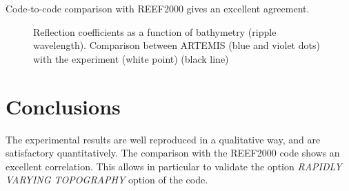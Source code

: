 Code-to-code comparison with REEF2000 gives an excellent agreement.

\begin{figure}[h]
\begin{center}
\end{center}
\caption{Reflection coefficients as a function of bathymetry (ripple wavelength).
Comparison between ARTEMIS (blue and violet dots) with
the experiment (white point) \cite{Michel1999} (black line)}
\label{fig:rides_resu}
\end{figure}

\section{Conclusions}

The experimental results are well reproduced in a qualitative way, and are satisfactory
quantitatively. The comparison with the REEF2000 code shows an excellent correlation.
This allows in particular to validate the option {\it RAPIDLY VARYING
 TOPOGRAPHY} option of the code.
